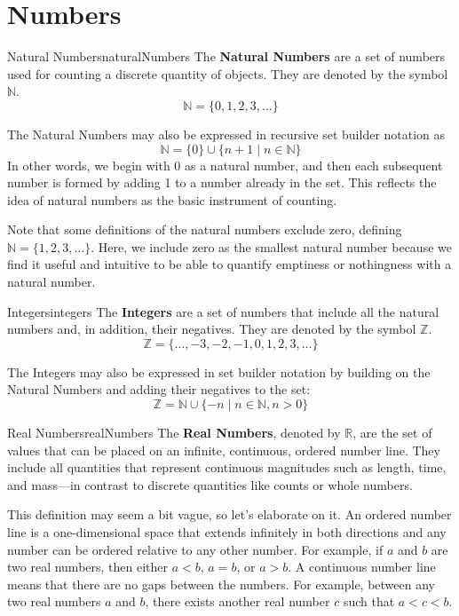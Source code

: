 \section{Numbers}

\begin{definition}{Natural Numbers}{naturalNumbers}
  The \textbf{Natural Numbers} are a set of numbers used for counting a discrete
  quantity of objects. They are denoted by the symbol \(\mathbb{N}\).
  \[
    \mathbb{N} = \{0, 1, 2, 3, \ldots\}
  \]
\end{definition}

The Natural Numbers may also be expressed in recursive set builder notation as
\[
  \mathbb{N} = \{ 0 \} \cup \{ n + 1 \mid n \in \mathbb{N} \}
\]
In other words, we begin with 0 as a natural number, and then each subsequent number
is formed by adding 1 to a number already in the set. This reflects the idea of
natural numbers as the basic instrument of counting.

Note that some definitions of the natural numbers exclude zero, defining
\(\mathbb{N} = \{1, 2, 3, \ldots\}\). Here, we include zero as the smallest natural
number because we find it useful and intuitive to be able to quantify emptiness
or nothingness with a natural number.

\begin{definition}{Integers}{integers}
  The \textbf{Integers} are a set of numbers that include all the natural numbers
  and, in addition, their negatives.
  They are denoted by the symbol \(\mathbb{Z}\).
  \[
    \mathbb{Z} = \{\ldots, -3, -2, -1, 0, 1, 2, 3, \ldots\}
  \]
\end{definition}

The Integers may also be expressed in set builder notation by building on the Natural Numbers
and adding their negatives to the set:
\[
  \mathbb{Z} = \mathbb{N} \cup \{-n \mid n \in \mathbb{N}, n > 0\}
\]

\begin{definition}{Real Numbers}{realNumbers}
  The \textbf{Real Numbers}, denoted by \(\mathbb{R}\), are the set of values that can be placed
  on an infinite, continuous, ordered number line. They include all quantities that represent
  continuous magnitudes such as length, time, and mass—in contrast to discrete quantities like
  counts or whole numbers.
\end{definition}

This definition may seem a bit vague, so let's elaborate on it. An ordered number line is a
one-dimensional space that extends infinitely in both directions and any number can be
ordered relative to any other number. For example, if \( a \) and \( b \) are two real numbers,
then either \(a < b\), \(a = b\), or \(a > b\). A continuous number line means that there are
no gaps between the numbers. For example, between any two real numbers \( a \) and \( b \), there
exists another real number \( c \) such that \(a < c < b\).

